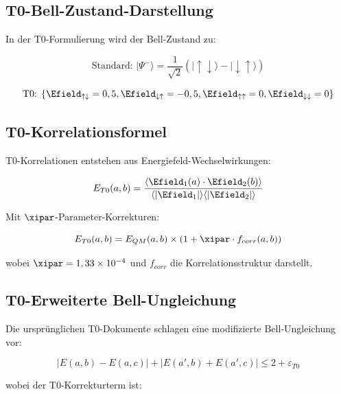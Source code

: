 	\subsection{T0-Bell-Zustand-Darstellung}
	
	In der T0-Formulierung wird der Bell-Zustand zu:
	
	\begin{equation}
		\text{Standard: } |\Psi^-\rangle = \frac{1}{\sqrt{2}}(|\uparrow\downarrow\rangle - |\downarrow\uparrow\rangle)
	\end{equation}
	
	\begin{equation}
		\text{T0: } \{\Efield_{\uparrow\downarrow} = 0,5, \Efield_{\downarrow\uparrow} = -0,5, \Efield_{\uparrow\uparrow} = 0, \Efield_{\downarrow\downarrow} = 0\}
	\end{equation}
	
	\subsection{T0-Korrelationsformel}
	
	T0-Korrelationen entstehen aus Energiefeld-Wechselwirkungen:
	
	\begin{equation}
		E_{T0}(a,b) = \frac{\langle \Efield_1(a) \cdot \Efield_2(b) \rangle}{\langle |\Efield_1| \rangle \langle |\Efield_2| \rangle}
	\end{equation}
	
	Mit $\xipar$-Parameter-Korrekturen:
	
	\begin{equation}
		E_{T0}(a,b) = E_{QM}(a,b) \times (1 + \xipar \cdot f_{corr}(a,b))
	\end{equation}
	
	wobei $\xipar = 1,33 \times 10^{-4}$ und $f_{corr}$ die Korrelationsstruktur darstellt.
	
	\subsection{T0-Erweiterte Bell-Ungleichung}
	
	Die ursprünglichen T0-Dokumente schlagen eine modifizierte Bell-Ungleichung vor:
	
	\begin{equation}
		|E(a,b) - E(a,c)| + |E(a',b) + E(a',c)| \leq 2 + \varepsilon_{T0}
	\end{equation}
	
	wobei der T0-Korrekturterm ist:
	
